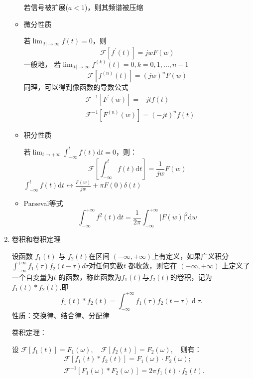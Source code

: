 \documentclass[a4paper,11pt,UTF8]{article}
\begin{document}
\begin{enumerate}
\begin{itemize}
		若信号被扩展($a<1$)，则其频谱被压缩
		
		\item 微分性质
		
		若$\lim_{|t|\to\infty}f(t)=0$，则
		$$
		\mathcal{F}[f^\prime(t)]=jwF(w)
		$$
		一般地， 若$\lim_{|t|\to\infty}f^{(k)}(t)=0,k=0,1,...,n-1$
		$$
		\mathcal{F}[f^{(n)}(t)]=(jw)^nF(w)
		$$
		同理，可以得到像函数的导数公式
		$$
		\begin{aligned}
			&\mathcal{F}^{-1}[F^\prime(w)]=-jtf(t)\\
			&\mathcal{F}^{-1}[F^{(n)}(w)]=(-jt)^nf(t)
		\end{aligned}
		$$
		
		\item 积分性质
		
		若$\lim_{t\to+\infty}\int_{-\infty}^tf(t)\mathrm{d}t=0$，则：
		$$
		\mathcal{F}[\int_{-\infty}^tf(t)\mathrm{d}t]=\frac1{jw}F(w)
		$$
		$\int_{-\infty}^tf(t)\mathrm{d}t\leftrightarrow\frac{F(w)}{jw}+\pi F(0)\delta(t)$
		
		\item Parseval等式
		$$
		\int_{-\infty}^{+\infty}f^2(t)\mathrm{d}t=\frac1{2\pi}\int_{-\infty}^{+\infty}|F(w)|^2\mathrm{d}w
		$$
	\end{itemize}
	\item 卷积和卷积定理
	
	设函数 $f_1(t)$ 与 $f_2(t)$在区间 $(-\infty,+\infty)$上有定义，如果广义积分$\int _{- \infty}^{+ \infty}f_1( \tau) f_2( t- \tau)d\tau$对任何实数$t$ 都收敛，则它在 $(-\infty,+\infty)$ 上定义了一个自变量为$t$ 的函数，称此函数为$f_1(t)$与$f_2(t)$的卷积，记为$f_1(t)*f_2(t)$,即
	$$
	f_1(t)*f_2(t)=\int_{-\infty}^{+\infty}f_1(\tau)f_2(t-\tau)\operatorname{d}\tau.
	$$
	性质：交换律、结合律、分配律
	
	卷积定理：
	
	设 $\mathcal{F}[f_1(t)]{=}F_1(\omega),\quad\mathcal{F}[f_2(t)]{=}F_2(\omega),\quad $则有：
	$$
	\begin{aligned}
		&\mathcal{F}[f_1(t)*f_2(t)]=F_1(\omega)\cdotp F_2(\omega);\\
		&\mathcal{F}^{-1}[F_1(\omega)*F_2(\omega)]=2\pi f_1(t)\cdotp f_2(t).
	\end{aligned}
	$$
	
\end{enumerate}
\end{document}
